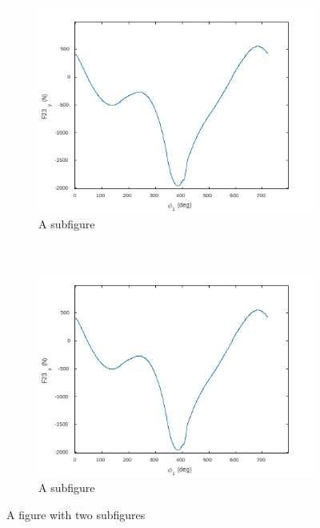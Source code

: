 \begin{figure}
	\begin{subfigure}{.3\textwidth}
		\centering
		\includegraphics[width=\linewidth]{09}
		\caption{A subfigure}
		\label{fig:sub4}
	\end{subfigure}~
	\begin{subfigure}{.3\textwidth}
		\centering
		\includegraphics[width=\linewidth]{09}
		\caption{A subfigure}
		\label{fig:sub5}
	\end{subfigure}
	\caption{A figure with two subfigures}
	\label{fig:test}
\end{figure}

